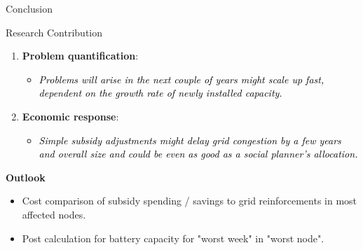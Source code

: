 \documentclass[10pt, aspectration=169]{beamer}
\begin{document}
\begin{frame}{Conclusion}
\begin{block}{Research Contribution}
    \begin{enumerate}
        \item \textbf{Problem quantification}: 
        \begin{itemize}
            \item \textcolor{black}{\textit{Problems will arise in the next couple of years might scale up fast, dependent on the growth rate of newly installed capacity.}}
        \end{itemize}
        \vspace{0.1cm}
        \item \textbf{Economic response}: 
        \begin{itemize}
            \item \textcolor{black}{\textit{Simple subsidy adjustments might delay grid congestion by a few years and overall size and could be even as good as a social planner's allocation. }}
        \end{itemize}
    \end{enumerate}
\end{block}

\textbf{Outlook}
\begin{itemize}
    \item Cost comparison of subsidy spending / savings to grid reinforcements in most affected nodes.
    \item Post calculation for battery capacity for "worst week" in "worst node". 
\end{itemize}


\end{frame}
\end{document}
